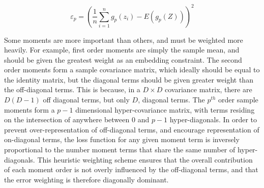 \documentclass[10pt,twocolumn,letterpaper]{article}
\begin{document}
\begin{equation}
	\varepsilon_p = \left( \frac{1}{n} \sum_{i=1}^n g_p(z_i) - E(g_p(Z)) \right)^2
\end{equation}

Some moments are more important than others, and must be weighted more heavily.  
For example, first order moments are simply the sample mean, and should be given the greatest weight as an embedding constraint.  
The second order moments form a sample covariance matrix, which ideally should be equal to the identity matrix, but the diagonal terms should be given greater weight than the off-diagonal terms.  
This is because, in a $D \times D$ covariance matrix, there are $D(D-1)$ off diagonal terms, but only $D$, diagonal terms.  
The $p^{th}$ order sample moments form a $p-1$ dimensional hyper-covariance matrix, with terms residing on the intersection of anywhere between $0$ and $p-1$ hyper-diagonals.  
In order to prevent over-representation of off-diagonal terms, and encourage representation of on-diagonal terms, the loss function for any given moment term is inversely proportional to the number moment terms that share the same number of hyper-diagonals.  
This heuristic weighting scheme ensures that the overall contribution of each moment order is not overly influenced by the off-diagonal terms, and that the error weighting is therefore diagonally dominant.

%
\end{document}
